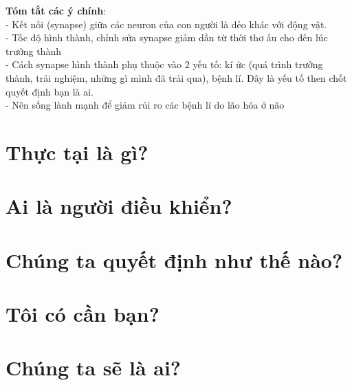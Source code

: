 \documentclass{article}
\newcommand\tab[1][1cm]{\hspace*{#1}}
\begin{document}
\tab \textbf{Tóm tắt các ý chính}: \\
\tab\tab - Kết nối (synapse) giữa các neuron của con người là dẻo khác với động vật.\\
\tab\tab - Tốc độ hình thành, chỉnh sửa synapse giảm dần từ thời thơ ấu cho đến lúc trưởng thành\\
\tab\tab - Cách synapse hình thành phụ thuộc vào 2 yếu tố: kí ức (quá trình trưởng thành, trải nghiệm, những gì mình đã trải qua), bệnh lí. Đây là yếu tố then chốt quyết định bạn là ai. \\
\tab\tab - Nên sống lành mạnh để giảm rủi ro các bệnh lí do lão hóa ở não\\

\section{Thực tại là gì?}
\section{Ai là người điều khiển?}
\section{Chúng ta quyết định như thế nào?}
\section{Tôi có cần bạn?}
\section{Chúng ta sẽ là ai?}
\end{document}
